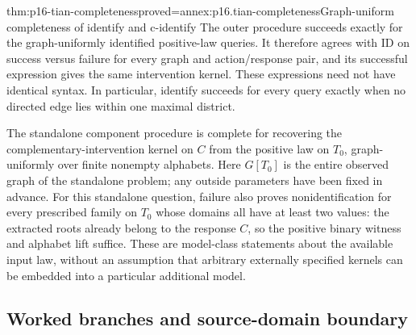 \begin{hbtheorem}{thm:p16-tian-completeness}{proved=annex:p16.tian-completeness}{Graph-uniform completeness of identify and c-identify}
The outer procedure succeeds exactly for the graph-uniformly identified
positive-law queries. It therefore agrees with ID on success versus
failure for every graph and action/response pair, and its successful
expression gives the same intervention kernel. These expressions
need not have identical syntax. In particular, identify succeeds for
every query exactly when no directed edge lies within one maximal district.

The standalone component procedure is complete for recovering the
complementary-intervention kernel on \(C\) from the positive law
on \(T_0\), graph-uniformly over finite nonempty alphabets.
Here \(G[T_0]\) is the entire observed graph of the standalone
problem; any outside parameters have been fixed in advance.
For this standalone question, failure also proves nonidentification
for every prescribed family on \(T_0\) whose domains all have
at least two values: the extracted roots already belong to the
response \(C\), so the positive binary witness and alphabet lift
suffice. These are model-class statements about the available input
law, without an assumption that arbitrary externally specified kernels
can be embedded into a particular additional model.
\end{hbtheorem}

\subsection{Worked branches and source-domain boundary}


